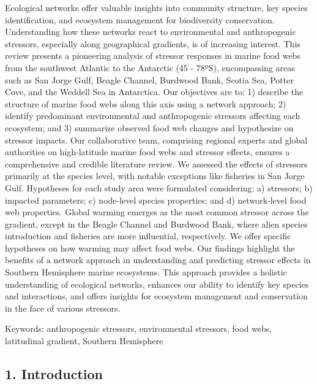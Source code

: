 \documentclass[
]{article}
\begin{document}
Ecological networks offer valuable insights into community structure,
key species identification, and ecosystem management for biodiversity
conservation. Understanding how these networks react to environmental
and anthropogenic stressors, especially along geographical gradients, is
of increasing interest. This review presents a pioneering analysis of
stressor responses in marine food webs from the southwest Atlantic to
the Antarctic (45 - 78ºS), encompassing areas such as San Jorge Gulf,
Beagle Channel, Burdwood Bank, Scotia Sea, Potter Cove, and the Weddell
Sea in Antarctica. Our objectives are to: 1) describe the structure of
marine food webs along this axis using a network approach; 2) identify
predominant environmental and anthropogenic stressors affecting each
ecosystem; and 3) summarize observed food web changes and hypothesize on
stressor impacts. Our collaborative team, comprising regional experts
and global authorities on high-latitude marine food webs and stressor
effects, ensures a comprehensive and credible literature review. We
assessed the effects of stressors primarily at the species level, with
notable exceptions like fisheries in San Jorge Gulf. Hypotheses for each
study area were formulated considering: a) stressors; b) impacted
parameters; c) node-level species properties; and d) network-level food
web properties. Global warming emerges as the most common stressor
across the gradient, except in the Beagle Channel and Burdwood Bank,
where alien species introduction and fisheries are more influential,
respectively. We offer specific hypotheses on how warming may affect
food webs. Our findings highlight the benefits of a network approach in
understanding and predicting stressor effects in Southern Hemisphere
marine ecosystems. This approach provides a holistic understanding of
ecological networks, enhances our ability to identify key species and
interactions, and offers insights for ecosystem management and
conservation in the face of various stressors.

Keywords: anthropogenic stressors, environmental stressors, food webs,
latitudinal gradient, Southern Hemisphere

\subsection{1. Introduction}\label{introduction}
\end{document}

